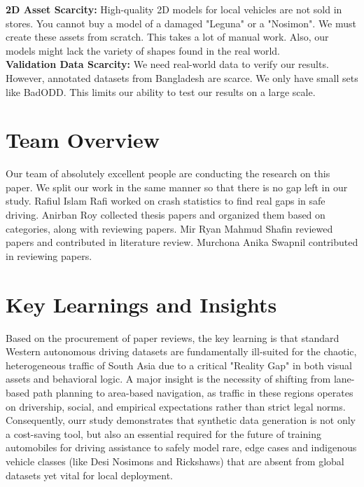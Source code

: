 \textbf{2D Asset Scarcity:} High-quality 2D models for local vehicles are not sold in stores. You cannot buy a model of a damaged "Leguna" or a "Nosimon". We must create these assets from scratch. This takes a lot of manual work. Also, our models might lack the variety of shapes found in the real world.\\

\textbf{Validation Data Scarcity:} We need real-world data to verify our results. However, annotated datasets from Bangladesh are scarce. We only have small sets like BadODD. This limits our ability to test our results on a large scale.\\


\section{Team Overview}

Our team of absolutely excellent people are conducting the research on this paper. We split our work in the same manner so that there is no gap left in our study. Rafiul Islam Rafi worked on crash statistics to find real gaps in safe driving. Anirban Roy collected thesis papers and organized them based on categories, along with reviewing papers. Mir Ryan Mahmud Shafin reviewed papers and contributed in literature review. Murchona Anika Swapnil contributed in reviewing papers.\\

\section{Key Learnings and Insights}

Based on the procurement of paper reviews, the key learning is that standard Western autonomous driving datasets are fundamentally ill-suited for the chaotic, heterogeneous traffic of South Asia due to a critical "Reality Gap" in both visual assets and behavioral logic. A major insight is the necessity of shifting from lane-based path planning to area-based navigation, as traffic in these regions operates on drivership, social, and empirical expectations rather than strict legal norms. Consequently, ourr study demonstrates that synthetic data generation is not only a cost-saving tool, but also an essential required for the future of training automobiles for driving assistance  to safely model rare, edge cases and indigenous vehicle classes (like Desi Nosimons and Rickshaws) that are absent from global datasets yet vital for local deployment.

